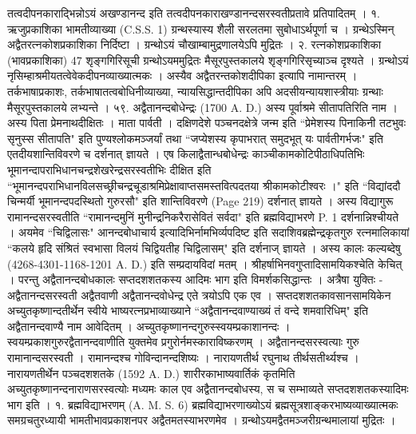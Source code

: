 तत्वदीपनकाराद्भिन्नोऽयं अखण्डानन्द इति तत्वदीपनकाराखण्डानन्दसरस्वतीप्रतावे प्रतिपादितम् ।
१. ऋजुप्रकाशिका भामतीव्याख्या (C.S.S. 1)
ग्रन्थस्यास्य शैली सरलतमा सुबोधाऽर्थपूर्णा च । ग्रन्थेऽस्मिन् अद्वैतरत्नकोशप्रकाशिका निर्दिष्टा । ग्रन्थोऽयं चौखाम्बामुद्रणालयेऽपि मुद्रितः ।
२. रत्नकोशप्रकाशिका (भावप्रकाशिका) 47 शृङ्गगिरिसूची 
ग्रन्थोऽयममुद्रितः मैसूरपुस्तकालये शृङ्गगिरिसृच्याञ्च दृश्यते । ग्रन्थोऽयं नृसिम्हाश्रमीयतत्वेवेकदीपनव्याख्यात्मकः । अस्यैव अद्वैतरन्तकोशदीपिका इत्यापि नामान्तरम् ।
तर्कभाषाप्रकाशः, तर्कभाषातत्वबोधिनीव्याख्या, न्यायसिद्धान्तदीपिका अपि अदसीयन्यायशास्त्रीयाः ग्रन्थाः मैसूरपुस्तकालये लभ्यन्ते ।
५९. अद्वैतानन्दबोधेन्द्रः (1700 A. D.)
अस्य पूर्वाश्रमे सीतापतिरिति नाम । अस्य पिता प्रेमनाथदीक्षितः । माता पार्वती । दक्षिणदेशे पञ्चनदक्षेत्रे जन्म इति ``प्रेमेशस्य पिनाकिनी तटभुवः सृनुस्स सीतापति" इति पुण्यश्लोकमञ्जर्यां तथा ``जप्येशस्य कृपाभरात् समुदभूत् यः पार्वतीगर्भजः" इति एतदीयशान्तिविवरणे च दर्शनात् ज्ञायते ।
एष किलाद्वैतान्धबोधेन्द्रः काञ्चीकामकोटिपीठाधिपतिभिः भूमानन्दापराभिधानचन्द्रशेखरेन्द्रसरस्वतीभिः दीक्षित इति ``भूमानन्दपराभिधानविलसच्छ्रीचन्द्रचूडाश्रमिप्रेक्षावाप्तसमस्तवित्पदतया श्रीकामकोटीश्वरः ।" इति ``विद्यांददौ चिन्मर्यी भूमानन्दपदस्थितो गुरुरसौ" इति शान्तिविवरणे (Page 219) दर्शनात् ज्ञायते । अस्य विद्यागुरू रामानन्दसरस्वतीति ``रामानन्दमुनिं मुनीन्द्रनिकरैरासेवितं सर्वदा" इति ब्रह्मविद्याभरणे P. 1 दर्शनान्निश्चीयते । अयमेव ``चिद्विलासः" आनन्दबोधाचार्य इत्यादिभिर्नामभिर्व्यपदिष्ट इति सदाशिवब्रह्मेन्द्रकृतगुरु रत्नमालिकायां ``कलये हृदि संश्रितं स्वभासा विलयं चिद्वियतीह चिद्विलासम्" इति दर्शनाज् ज्ञायते ।
अस्य कालः कल्यब्देषु (4268-4301-1168-1201 A. D.) इति सम्प्रदायविदां मतम् । श्रीहर्षाभिनवगुप्तादिसामयिकश्चेति केचित् ।
परन्तु अद्वैतानन्दबोधकालः सप्तदशशतकस्य आदिमः भाग इति विमर्शकसिद्धान्तः । अत्रैषा युक्तिः -
अद्वैतानन्दसरस्वती अद्वैतवाणी अद्वैतानन्दवोधेन्द्र एते त्रयोऽपि एक एव । सप्तदशशतकावसानसामयिकेन अच्युतकृष्णान्दतीर्थेन स्वीये भाष्यरत्नप्रभाव्याख्याने ``अद्वैतानन्दवाण्याख्यं तं वन्दे शमवारिधिम्" इति अद्वैतानन्दवाण्यै नाम आवेदितम् । अच्युतकृष्णानन्दगुरुस्स्वयम्प्रकाशानन्दः । स्वयम्प्रकाशगुरुरद्वैतानन्दवाणीति युक्तमेव प्रगुरोर्नमस्काराविष्करणम् । अद्वैतानन्दसरस्वत्याः गुरु रामानान्दसरस्वती । रामानन्दश्च गोविन्दानन्दशिष्यः । नारायणतीर्थ रघुनाथ तीर्थसतीर्थ्यश्च । नारायणतीर्थेन पञ्चदशशतके (1592 A. D.) शारीरकाभाष्यवार्तिकं कृतमिति अच्युतकृष्णानन्दनाराणसरस्वत्योः मध्यमः काल एव अद्वैतानन्दबोधस्य, स च सम्भाव्यते सप्तदशशतकस्यादिमः भाग इति ।
१. ब्रह्मविद्याभरणम् (A. M. S. 6)
ब्रह्मविद्याभरणाख्योऽयं ब्रह्मसूत्रशाङ्करभाष्यव्याख्यात्मकः समग्रचतुरध्यायी भामतीभावप्रकाशनपर अद्वैतमतस्याभरणमेव । ग्रन्थोऽयमद्वैतमञ्जरीग्रन्थमालायां मुद्रितः ।

